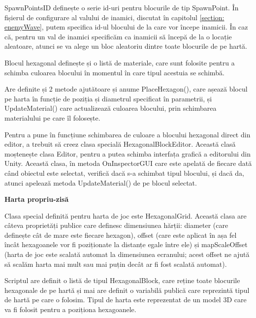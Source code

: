 \documentclass[12pt, a4paper]{article}
\begin{document}
	SpawnPointsID definește o serie id-uri pentru blocurile de tip SpawnPoint. În fișierul de configurare al valului de inamici, discutat în capitolul \ref{section: enemyWave}, putem specifica id-ul blocului de la care vor începe inamicii. În caz că, pentru un val de inamici specificăm ca inamicii să începă de la o locație aleatoare, atunci se va alege un bloc aleatoriu dintre toate blocurile de pe hartă.
	\newline
	
	Blocul hexagonal definește și o listă de materiale, care sunt folosite pentru a schimba culoarea blocului în momentul în care tipul acestuia se schimbă.
	\newline
	
	Are definite și 2 metode ajutătoare și anume PlaceHexagon(), care așează blocul pe harta în funcție de poziția și diametrul specificat în parametrii, și UpdateMaterial() care actualizează culoarea blocului, prin schimbarea materialului pe care îl folosește.
	\newline
	
	Pentru a pune în funcțiune schimbarea de culoare a blocului hexagonal direct din editor, a trebuit să creez clasa specială HexagonalBlockEditor. Această clasă moștenește clasa Editor, pentru a putea schimba interfața grafică a editorului din Unity. Această clasa, în metoda OnInspectorGUI care este apelată de fiecare dată când obiectul este selectat, verifică dacă s-a schimbat tipul blocului, și dacă da, atunci apelează metoda UpdateMaterial() de pe blocul selectat.
	\newline
	
	
	
	
	
	\textbf{Harta propriu-zisă}
	
	Clasa special definită pentru harta de joc este HexagonalGrid. Această clasa are câteva proprietăți publice care definesc dimensiunea hărții: diameter (care definește cât de mare este fiecare hexagon), offset (care este aplicat în așa fel încât hexagoanele vor fi poziționate la distanțe egale între ele) și mapScaleOffset (harta de joc este scalată automat la dimensiunea ecranului; acest offset ne ajută să scalăm harta mai mult sau mai puțin decât ar fi fost scalată automat).
	\newline
	
	Scriptul are definit o listă de tipul HexagonalBlock, care reține toate blocurile hexagonale de pe hartă și mai are definit o variabilă publică care reprezintă tipul de hartă pe care o folosim. Tipul de harta este reprezentat de un model 3D care va fi folosit pentru a poziționa hexagoanele.
	\newline
	
\end{document}
